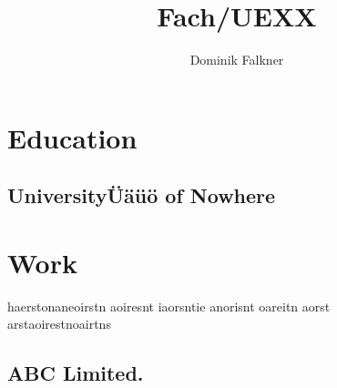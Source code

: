 \documentclass{\INCLUDE/protocol}
\title{\textbf{Fach/UEXX}}  %
\author{Dominik Falkner}    %
\begin{document}
\maketitle                  %

\section{Education}
\subsection{UniversityÜäüö of Nowhere}

\section{Work}
haerstonaneoirstn aoiresnt iaorsntie anorisnt oareitn aorst \\

arstaoirestnoairtns
\subsection{ABC Limited.}


\end{document}
